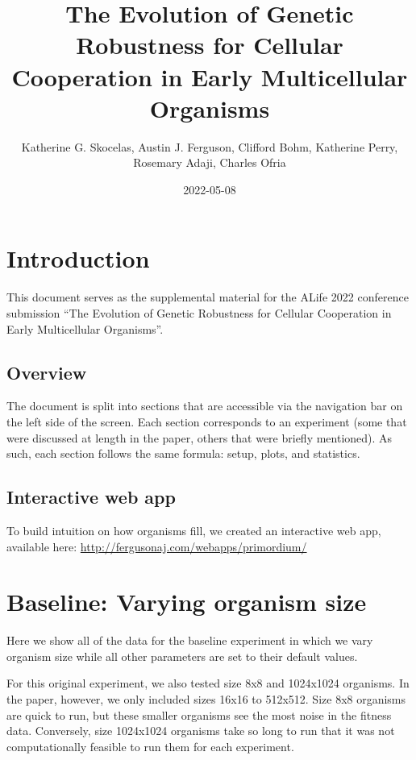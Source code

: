 \documentclass[
]{book}
\title{The Evolution of Genetic Robustness for Cellular Cooperation in Early Multicellular Organisms}
\author{Katherine G. Skocelas, Austin J. Ferguson, Clifford Bohm, Katherine Perry, Rosemary Adaji, Charles Ofria}
\date{2022-05-08}
\begin{document}
\maketitle

{
\setcounter{tocdepth}{1}
\tableofcontents
}
\hypertarget{introduction}{%
\chapter{Introduction}\label{introduction}}

This document serves as the supplemental material for the ALife 2022 conference submission ``The Evolution of Genetic Robustness for Cellular Cooperation in Early Multicellular Organisms''.

\hypertarget{overview}{%
\section{Overview}\label{overview}}

The document is split into sections that are accessible via the navigation bar on the left side of the screen.
Each section corresponds to an experiment (some that were discussed at length in the paper, others that were briefly mentioned).
As such, each section follows the same formula: setup, plots, and statistics.

\hypertarget{interactive-web-app}{%
\section{Interactive web app}\label{interactive-web-app}}

To build intuition on how organisms fill, we created an interactive web app, available here: \url{http://fergusonaj.com/webapps/primordium/}

\hypertarget{baseline-varying-organism-size}{%
\chapter{Baseline: Varying organism size}\label{baseline-varying-organism-size}}

Here we show all of the data for the baseline experiment in which we vary organism size while all other parameters are set to their default values.

For this original experiment, we also tested size 8x8 and 1024x1024 organisms.
In the paper, however, we only included sizes 16x16 to 512x512.
Size 8x8 organisms are quick to run, but these smaller organisms see the most noise in the fitness data.
Conversely, size 1024x1024 organisms take so long to run that it was not computationally feasible to run them for each experiment.
\end{document}

